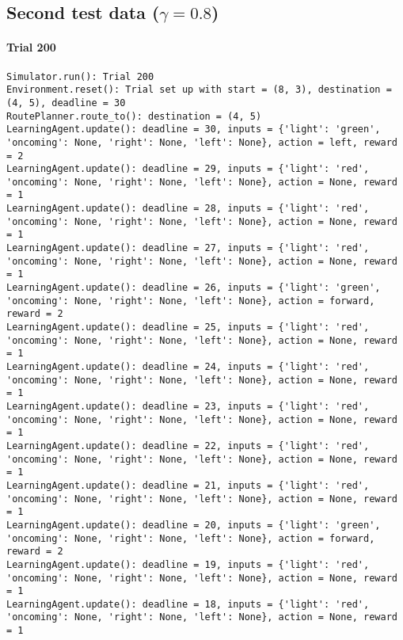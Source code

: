\documentclass{article}
\begin{document}
    \subsection{\texorpdfstring{Second test data
(\(\gamma = 0.8\))}{Second test data (\textbackslash{}gamma = 0.8)}}\label{second-test-data-gamma-0.8}

\paragraph{Trial 200}\label{trial-200}

\begin{verbatim}
Simulator.run(): Trial 200
Environment.reset(): Trial set up with start = (8, 3), destination = (4, 5), deadline = 30
RoutePlanner.route_to(): destination = (4, 5)
LearningAgent.update(): deadline = 30, inputs = {'light': 'green', 'oncoming': None, 'right': None, 'left': None}, action = left, reward = 2
LearningAgent.update(): deadline = 29, inputs = {'light': 'red', 'oncoming': None, 'right': None, 'left': None}, action = None, reward = 1
LearningAgent.update(): deadline = 28, inputs = {'light': 'red', 'oncoming': None, 'right': None, 'left': None}, action = None, reward = 1
LearningAgent.update(): deadline = 27, inputs = {'light': 'red', 'oncoming': None, 'right': None, 'left': None}, action = None, reward = 1
LearningAgent.update(): deadline = 26, inputs = {'light': 'green', 'oncoming': None, 'right': None, 'left': None}, action = forward, reward = 2
LearningAgent.update(): deadline = 25, inputs = {'light': 'red', 'oncoming': None, 'right': None, 'left': None}, action = None, reward = 1
LearningAgent.update(): deadline = 24, inputs = {'light': 'red', 'oncoming': None, 'right': None, 'left': None}, action = None, reward = 1
LearningAgent.update(): deadline = 23, inputs = {'light': 'red', 'oncoming': None, 'right': None, 'left': None}, action = None, reward = 1
LearningAgent.update(): deadline = 22, inputs = {'light': 'red', 'oncoming': None, 'right': None, 'left': None}, action = None, reward = 1
LearningAgent.update(): deadline = 21, inputs = {'light': 'red', 'oncoming': None, 'right': None, 'left': None}, action = None, reward = 1
LearningAgent.update(): deadline = 20, inputs = {'light': 'green', 'oncoming': None, 'right': None, 'left': None}, action = forward, reward = 2
LearningAgent.update(): deadline = 19, inputs = {'light': 'red', 'oncoming': None, 'right': None, 'left': None}, action = None, reward = 1
LearningAgent.update(): deadline = 18, inputs = {'light': 'red', 'oncoming': None, 'right': None, 'left': None}, action = None, reward = 1

\end{verbatim}
\end{document}
